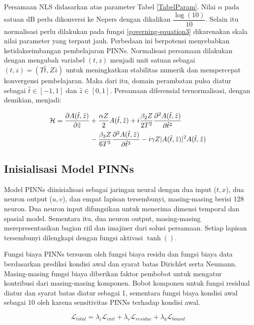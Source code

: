 Persamaan NLS didasarkan atas parameter Tabel \ref{TabelParam}. Nilai \(\alpha\) pada satuan dB perlu dikonversi ke Nepers dengan dikalikan \(\dfrac{\log(10)}{10}\). Selain itu normalisasi  perlu dilakukan pada fungsi \eqref{governing-equation3} dikarenakan skala nilai parameter yang terpaut jauh. Perbedaan ini berpotensi menyebabkan ketidakseimbangan pembelajaran PINNs. Normalisasi persamaan dilakukan dengan mengubah variabel $(t,z)$ menjadi unit satuan sebagai $(t,z) = (T\hat{t}, Z\hat{z})$ untuk meningkatkan stabilitas numerik dan mempercepat konvergensi pembelajaran. Maka dari itu, domain perambatan pulsa diatur sebagai $\hat{t} \in [-1,1]$ dan $\hat{z} \in [0,1]$. Persamaan diferensial ternormalisasi, dengan demikian, menjadi:

\begin{align}
    \mathcal{H} =\frac{\partial A(\hat{t},\hat{z})}{\partial \hat{z}}
    &+ \frac{\alpha Z}{2} A(\hat{t},\hat{z}) 
    + i \frac{\beta_2 Z}{2T^2} \frac{\partial^2 A(\hat{t},\hat{z})}{\partial \hat{t}^2} \notag \\
    &-  \frac{\beta_3 Z}{6T^3} \frac{\partial^3 A(\hat{t},\hat{z})}{\partial \hat{t}^3} 
    - i \gamma Z |A(\hat{t},\hat{z})|^2 A(\hat{t},\hat{z})
    \label{normalized-eq}
\end{align}
\subsection{Inisialisasi Model PINNs}

Model PINNs diinisialisasi sebagai jaringan neural dengan dua input (\(t,x\)), dua neuron output (\(u,v\)), dan empat lapisan tersembunyi, masing-masing berisi 128 neuron. Dua neuron input difungsikan untuk menerima dimensi temporal dan spasial model. Sementara itu, dua neuron output, masing-masing merepresentasikan bagian riil dan imajiner dari solusi persamaan. Setiap lapisan tersembunyi dilengkapi dengan fungsi aktivasi \(\tanh()\). 

Fungsi biaya PINNs tersusun oleh fungsi biaya residu dan fungsi biaya data berdasarkan prediksi kondisi awal dan syarat batas Dirichlet serta Neumann. Masing-masing fungsi biaya diberikan faktor pembobot untuk mengatur kontribusi dari masing-masing komponen. Bobot komponen untuk fungsi residual diatur dan syarat batas diatur sebagai 1, sementara fungsi biaya kondisi awal sebagai 10 oleh karena sensitivitas PINNs terhadap kondisi awal.

\begin{equation}
    \mathcal{L}_{total} = \lambda_{i}\mathcal{L}_{init}+\lambda_{r}\mathcal{L}_{residue}+\lambda_{b}\mathcal{L}_{bound}
    \label{total-loss}
\end{equation}

